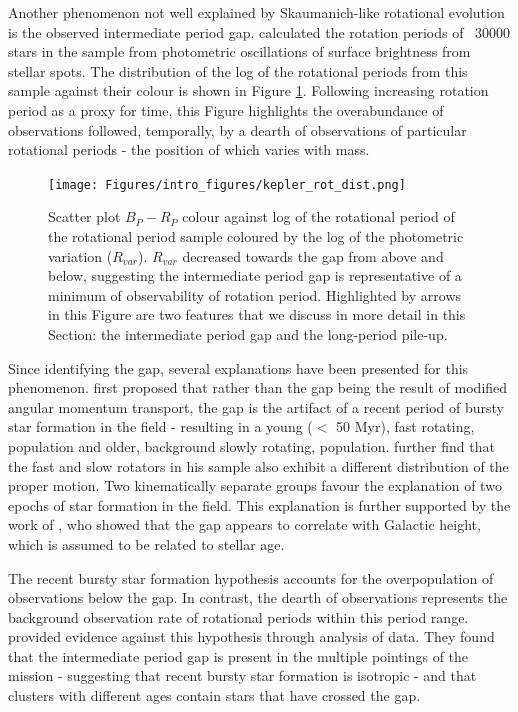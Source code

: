 Another phenomenon not well explained by Skaumanich-like rotational evolution is the observed intermediate period gap.
\citet{mcquillan_rotation_2014} calculated the rotation periods of ~30000 stars in the \kepler{} sample from photometric oscillations of surface brightness from stellar spots.
The distribution of the log of the rotational periods from this sample against their colour is shown in Figure \ref{fig:kepler_rot_period}. 
Following increasing rotation period as a proxy for time, this Figure highlights the overabundance of observations followed, temporally, by a dearth of observations of particular rotational periods - the position of which varies with mass.

\begin{figure}[h]
    \texttt{[image: Figures/intro\_figures/kepler\_rot\_dist.png]}
    \caption{Scatter plot \gaia{} $B_P-R_P$ colour against log of the rotational period of the \kepler{} \citet{mcquillan_rotation_2014} rotational period sample coloured by the log of the photometric variation ($R_{var}$).
    $R_{var}$ decreased towards the gap from above and below, suggesting the intermediate period gap is representative of a minimum of observability of rotation period. Highlighted by arrows in this Figure are two features that we discuss in more detail in this Section: the intermediate period gap and the long-period pile-up.}
    \label{fig:kepler_rot_period}
\end{figure}

Since identifying the gap, several explanations have been presented for this phenomenon.
\citet{mcquillan_rotation_2014, davenport_rotating_2017} first proposed that rather than the gap being the result of modified angular momentum transport, the gap is the artifact of a recent period of bursty star formation in the \kepler{} field - resulting in a young ($<$ 50 Myr), fast rotating, population and older, background slowly rotating, population.
\citet{davenport_rotating_2017} further find that the fast and slow rotators in his sample also exhibit a different distribution of the proper motion.
Two kinematically separate groups favour the explanation of two epochs of star formation in the \kepler{} field. 
This explanation is further supported by the work of \citet{davenport_rotating_2018}, who showed that the gap appears to correlate with Galactic height, which is assumed to be related to stellar age.

The recent bursty star formation hypothesis accounts for the overpopulation of observations below the gap. 
In contrast, the dearth of observations represents the background observation rate of rotational periods within this period range.
\citet{gordon_stellar_2021} provided evidence against this hypothesis through analysis of \ktoo{} data.
They found that the intermediate period gap is present in the multiple pointings of the \ktoo{} mission - suggesting that recent bursty star formation is isotropic -  and that clusters with different ages contain stars that have crossed the gap.

